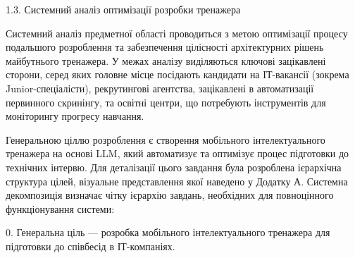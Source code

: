\documentclass[
]{article}
\begin{document}
\protect{}\label{_Toc228981054}{}1.3. Системний аналіз
оптимізації розробки тренажера

Системний аналіз предметної області проводиться з метою оптимізації
процесу подальшого розроблення та забезпечення цілісності архітектурних
рішень майбутнього тренажера. У межах аналізу виділяються ключові
зацікавлені сторони, серед яких головне місце посідають кандидати на
ІТ-вакансії (зокрема Junior-спеціалісти), рекрутингові агентства,
зацікавлені в автоматизації первинного скринінгу, та освітні центри, що
потребують інструментів для моніторингу прогресу навчання.

Генеральною ціллю розроблення є створення мобільного інтелектуального
тренажера на основі LLM, який автоматизує та оптимізує процес підготовки
до технічних інтерв\textquotesingle ю. Для деталізації цього завдання
була розроблена ієрархічна структура цілей, візуальне представлення якої
наведено у Додатку А. Системна декомпозиція визначає чітку ієрархію
завдань, необхідних для повноцінного функціонування системи:

0. Генеральна ціль --- розробка мобільного інтелектуального тренажера
для підготовки до співбесід в ІТ-компаніях.
\end{document}
